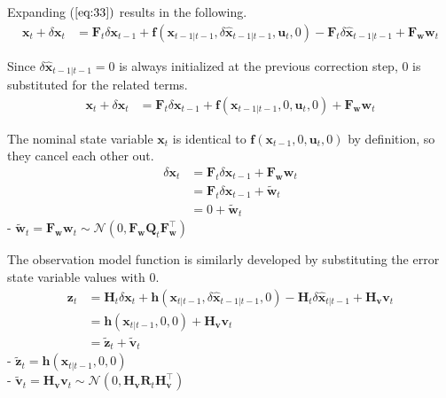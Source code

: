 \documentclass[10pt]{article}
\begin{document}
	Expanding ($\ref{eq:33})$ results in the following.
	\begin{equation} 
		\begin{aligned} 
			\mathbf{x}_{t} + \delta \mathbf{x}_{t} & = \mathbf{F}_{t} \delta \mathbf{x}_{t-1} +  \mathbf{f} ( \mathbf{x}_{t-1|t-1}, \delta \hat{\mathbf{x}}_{t-1|t-1},\mathbf{u}_{t}, 0) - \mathbf{F}_{t} \delta  
			\hat{\mathbf{x}}_{t-1|t-1} + \mathbf{F}_{\mathbf{w}} \mathbf{w}_{t} 
		\end{aligned} 
	\end{equation}
	
	Since $\delta \hat{\mathbf{x}}_{t-1|t-1}=0$ is always initialized at the previous correction step, 0 is substituted for the related terms.
	\begin{equation} 
		\begin{aligned} 
			\mathbf{x}_{t} + \delta \mathbf{x}_{t} & = \mathbf{F}_{t} \delta \mathbf{x}_{t-1} +  \mathbf{f} ( \mathbf{x}_{t-1|t-1}, 0,\mathbf{u}_{t}, 0) + \mathbf{F}_{\mathbf{w}} \mathbf{w}_{t} 
		\end{aligned} 
	\end{equation}
	
	The nominal state variable $\mathbf{x}_{t}$ is identical to $\mathbf{f}(\mathbf{x}_{t-1}, 0, \mathbf{u}_{t}, 0)$ by definition, so they cancel each other out.
	\begin{equation} 
		\boxed { \begin{aligned} 
				\delta \mathbf{x}_{t} & = \mathbf{F}_{t} \delta \mathbf{x}_{t-1}  + \mathbf{F}_{\mathbf{w}} \mathbf{w}_{t} \\ 
				& = \mathbf{F}_{t} \delta \mathbf{x}_{t-1} +  \tilde{\mathbf{w}}_{t} \\ 
				& = 0 + \tilde{\mathbf{w}}_{t}
		\end{aligned}  }
	\end{equation}
	- $\tilde{\mathbf{w}}_{t} = \mathbf{F}_{\mathbf{w}} \mathbf{w}_{t} \sim \mathcal{N}(0, \mathbf{F}_{\mathbf{w}}\mathbf{Q}_{t} \mathbf{F}_{\mathbf{w}}^{\intercal})$
	
	The observation model function is similarly developed by substituting the error state variable values with 0.
	\begin{equation}  \label{eq:eskf-z}
		\boxed{  \begin{aligned} 
				\mathbf{z}_{t} &= \mathbf{H}_{t} \delta \mathbf{x}_{t} + \mathbf{h}(  
				\mathbf{x}_{t|t-1}, \delta \hat{\mathbf{x}}_{t-1|t-1}, 0) - \mathbf{H}_{t} \delta \hat{\mathbf{x}}_{t|t-1} + \mathbf{H}_{\mathbf{v}} \mathbf{v}_{t} \\
				& = \mathbf{h}( \mathbf{x}_{t|t-1}, 0, 0) + \mathbf{H}_{\mathbf{v}} \mathbf{v}_{t} \\
				& =  \tilde{\mathbf{z}}_{t} + \tilde{\mathbf{v}}_{t}
		\end{aligned} }
	\end{equation}
	- $\tilde{\mathbf{z}}_{t} = \mathbf{h}( \mathbf{x}_{t|t-1}, 0, 0)$\\
	- $\tilde{\mathbf{v}}_{t} = \mathbf{H}_{\mathbf{v}} \mathbf{v}_{t} \sim \mathcal{N}(0, \mathbf{H}_{\mathbf{v}}\mathbf{R}_{t} \mathbf{H}_{\mathbf{v}}^{\intercal})$\\
	
\end{document}
